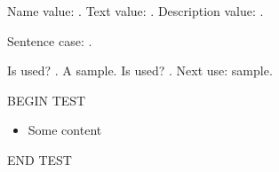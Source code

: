 \documentclass{article}
\begin{document}
Name value: .
Text value: .
Description value: .

Sentence case: .

Is used? .
A \gls{sample}.
Is used? .
Next use: \gls{sample}.



\newenvironment{test}{BEGIN TEST\begin{itemize}}{\end{itemize}END TEST}
\begin{test}\item Some content\end{test}
\end{document}
